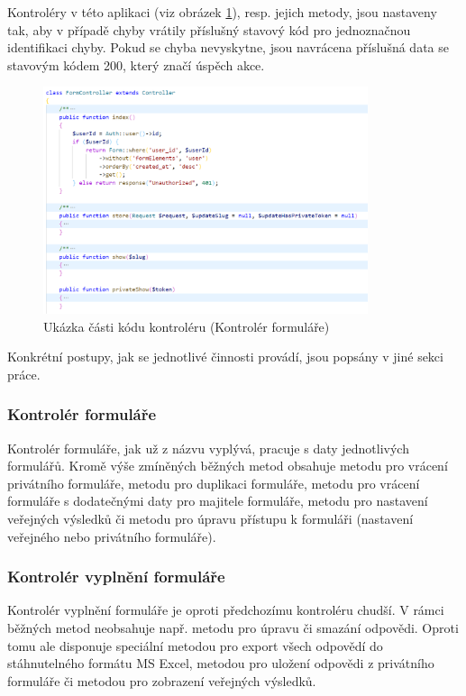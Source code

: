     Kontroléry v této aplikaci (viz obrázek \ref{fig:kontroler}), resp. jejich metody, jsou nastaveny tak, aby v případě chyby vrátily příslušný stavový kód pro jednoznačnou identifikaci chyby. Pokud se chyba nevyskytne, jsou navrácena příslušná data se stavovým kódem 200, který značí úspěch akce. 
    
    \begin{figure}[H]
    	\centering
    	\includegraphics[width=0.85\textwidth]{img/kontroler.png}
    	\caption{Ukázka části kódu kontroléru (Kontrolér formuláře)}
    	\label{fig:kontroler}
    \end{figure}
    
    Konkrétní postupy, jak se jednotlivé činnosti provádí, jsou popsány v jiné sekci práce.
		\subsubsection{Kontrolér formuláře}
		Kontrolér formuláře, jak už z názvu vyplývá, pracuje s daty jednotlivých formulářů. Kromě výše zmíněných běžných metod obsahuje metodu pro vrácení privátního formuláře, metodu pro duplikaci formuláře, metodu pro vrácení formuláře s dodatečnými daty pro majitele formuláře, metodu pro nastavení veřejných výsledků či metodu pro úpravu přístupu k formuláři (nastavení veřejného nebo privátního formuláře).
		
		\subsubsection{Kontrolér vyplnění formuláře}
		Kontrolér vyplnění formuláře je oproti předchozímu kontroléru chudší. V rámci běžných metod neobsahuje např. metodu pro úpravu či smazání odpovědi. Oproti tomu ale disponuje speciální metodou pro export všech odpovědí do stáhnutelného formátu MS Excel, metodou pro uložení odpovědi z privátního formuláře či metodou pro zobrazení veřejných výsledků.
		
